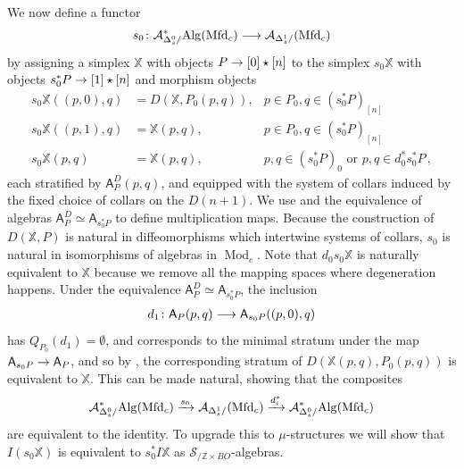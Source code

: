 \documentclass[10pt]{amsart}
\numberwithin{equation}{section}
\theoremstyle{definition}
\DeclareMathOperator{\Mod}{Mod}
\newcommand{\Mfd}{\mathrm{Mfd}\vphantom{d}}
\newcommand{\Alg}{\mathrm{Alg}\vphantom{z}}
\newcommand{\bZ}{\mathbb{Z}}
\newcommand{\bX}{\mathbb{X}}
\newcommand{\cA}{\mathcal{A}}
\newcommand{\cS}{\mathcal{S}}
\newcommand{\sfA}{\mathsf{A}}
\newcommand{\join}{\star}
\renewcommand{\to}{\mathchoice{\longrightarrow}{\rightarrow}{}{}}
\begin{document}
We now define a functor
\begin{align*}
	s_{0}\colon \cA_{\Delta^{0}_{s}/}^{*}\Alg(\Mfd_{c}) \to \cA_{\Delta^{1}_{s}/}(\Mfd_{c})
\end{align*}
by assigning a simplex $\bX$ with objects $P\to [0]\join [n]$ to the simplex $s_{0}\bX$ with objects $s_{0}^{*}P\to [1]\join [n]$ and morphism objects
\begin{align*}
	s_{0}\bX( (p,0) ,q) &= D(\bX, P_{0}(p,q)), & p\in P_{0}, q\in (s_{0}^{*}P)_{[n]}\\
	s_{0}\bX( (p,1), q ) &= \bX(p,q), & p\in P_{0}, q\in (s_{0}^{*}P)_{[n]} \\
	s_{0}\bX(p,q) &= \bX(p,q), & p,q \in (s_{0}^{*}P)_{0} \text{ or } p,q \in d_{0}^{*}s_{0}^{*}P \,,
\end{align*}
each stratified by $\sfA^{D}_{P}(p,q)$, and equipped with the system of collars induced by the fixed choice of collars on the $D(n+1)$.
We use  and the equivalence of algebras  $\sfA^{D}_{P}\simeq \sfA_{s_{0}^{*}P}$ to define multiplication maps.
Because the construction of $D(\bX,P)$ is natural in diffeomorphisms which intertwine systems of collars, $s_{0}$ is natural in isomorphisms of algebras in $\Mod_{c}$.
Note that $d_{0}s_{0}\bX$ is naturally equivalent to $\bX$ because we remove all the mapping spaces where degeneration happens.
Under the equivalence $\sfA^{D}_{P} \simeq \sfA_{s_{0}^{*}P}$, the inclusion
\begin{align*}
	d_{1} \colon \sfA_{P}(p,q) \to \sfA_{s_{0}P}( (p,0),q )
\end{align*}
has $Q_{P_{0}}(d_{1})=\emptyset$, and corresponds to the minimal stratum under the map $\sfA_{s_{0}P} \to \sfA_{P}$, and so by , the corresponding stratum of $D(\bX(p,q), P_{0}(p,q))$ is equivalent to $\bX$.
This can be made natural, showing that the composites
\begin{align*}
	\cA_{\Delta^{0}_{s}/}^{*}\Alg(\Mfd_{c}) \xrightarrow{s_{0}} \cA_{\Delta^{1}_{s}/}(\Mfd_{c}) \xrightarrow{d_{i}^{*}} \cA_{\Delta^{0}_{s}/}^{*}\Alg(\Mfd_{c})
\end{align*}
are equivalent to the identity. To upgrade this to $\mu$-structures we will show that $I(s_{0}\bX)$ is equivalent to $s_{0}^{*}I\bX$ as $\cS_{/ \bZ\times BO}$-algebras.
\end{document}
